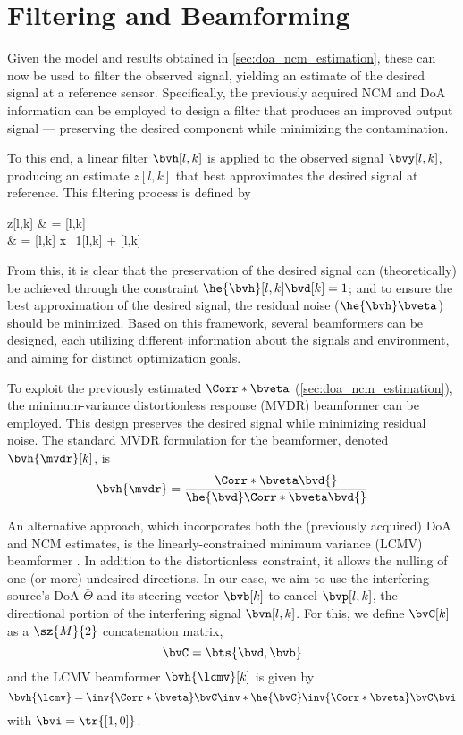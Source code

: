 \section{Filtering and Beamforming}
\label{sec:filtering_beamforming}

Given the model and results obtained in \cref{sec:doa_ncm_estimation}, these can now be used to filter the observed signal, yielding an estimate of the desired signal at a reference sensor. Specifically, the previously acquired NCM and DoA information can be employed to design a filter that produces an improved output signal — preserving the desired component while minimizing the contamination.

To this end, a linear filter $\bvh[l,k]$ is applied to the observed signal $\bvy[l,k]$, producing an estimate $z[l,k]$ that best approximates the desired signal at reference. This filtering process is defined by
\begin{equations}
	z[l,k] 
	& = \he{\bvh}[l,k] \bvy[l,k] \\
	& = \he{\bvh}[l,k] \bvd[k] x_1[l,k] + \he{\bvh}[l,k] \bveta[l,k]
\end{equations}

From this, it is clear that the preservation of the desired signal can (theoretically) be achieved through the constraint $\he{\bvh}[l,k] \bvd[k] = 1$; and to ensure the best approximation of the desired signal, the residual noise ($\he{\bvh}\bveta$) should be minimized. Based on this framework, several beamformers can be designed, each utilizing different information about the signals and environment, and aiming for distinct optimization goals.

To exploit the previously estimated $\Corr*{\bveta}$ (\cref{sec:doa_ncm_estimation}), the minimum-variance distortionless response (MVDR) \cite{souden_study_2010} beamformer can be employed. This design preserves the desired signal while minimizing residual noise. The standard MVDR formulation for the beamformer, denoted $\bvh{\mvdr}[k]$, is
\begin{equation}
	\bvh{\mvdr} = \frac{ \Corr*{\bveta} \bvd{} }{ \he{\bvd} \Corr*{\bveta} \bvd{} }
\end{equation}

An alternative approach, which incorporates both the (previously acquired) DoA and NCM estimates, is the linearly-constrained minimum variance (LCMV) beamformer \cite{souden_study_2010}. In addition to the distortionless constraint, it allows the nulling of one (or more) undesired directions. In our case, we aim to use the interfering source's DoA $\bar{\Theta}$ and its steering vector $\bvb[k]$ to cancel $\bvp[l,k]$, the directional portion of the interfering signal $\bvn[l,k]$. For this, we define $\bvC[k]$ as a $\sz{M}{2}$ concatenation matrix,
\begin{equation}
	\bvC = \bts{ \bvd , \bvb }
\end{equation}
and the LCMV beamformer $\bvh{\lcmv}[k]$ is given by
\begin{equation}
	\bvh{\lcmv} = \inv{\Corr*{\bveta}} \bvC \inv*{\he{\bvC} \inv{\Corr*{\bveta}} \bvC} \bvi
\end{equation}
with $\bvi = \tr{[1, 0]}$.

